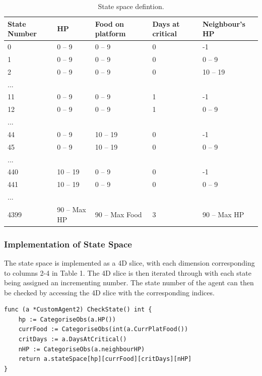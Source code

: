 \begin{table}
\centering
\caption{State space defintion.}
\begin{adjustbox}{width=\columnwidth,center}
\begin{tabular}{@{}lllll@{}}
\toprule
State Number & HP          & Food on platform & Days at critical & Neighbour’s HP \\ \midrule
0            & 0 – 9       & 0 – 9            & 0                & -1             \\
1            & 0 – 9       & 0 – 9            & 0                & 0 – 9          \\
2            & 0 – 9       & 0 – 9            & 0                & 10 – 19        \\
...          &             &                  &                  &                \\
11           & 0 – 9       & 0 – 9            & 1                & -1             \\
12           & 0 – 9       & 0 – 9            & 1                & 0 – 9          \\
...          &             &                  &                  &                \\
44           & 0 – 9       & 10 – 19          & 0                & -1             \\
45           & 0 – 9       & 10 – 19          & 0                & 0 – 9          \\
...          &             &                  &                  &                \\
440          & 10 – 19     & 0 – 9            & 0                & -1             \\
441          & 10 – 19     & 0 – 9            & 0                & 0 – 9          \\
...          &             &                  &                  &                \\
4399         & 90 – Max HP & 90 – Max Food    & 3                & 90 – Max HP    \\ \bottomrule
\end{tabular}
\end{adjustbox}
\label{state-table}
\end{table}
\subsubsection{Implementation of State Space}
The state space is implemented as a 4D slice, with each dimension corresponding to columns 2-4 in Table 1. The 4D slice is then iterated through with each state being assigned an incrementing number. The state number of the agent can then be checked by accessing the 4D slice with the corresponding indices.
\begin{lstlisting}
func (a *CustomAgent2) CheckState() int {
	hp := CategoriseObs(a.HP())
	currFood := CategoriseObs(int(a.CurrPlatFood())
	critDays := a.DaysAtCritical()
	nHP := CategoriseObs(a.neighbourHP)
	return a.stateSpace[hp][currFood][critDays][nHP]
}
\end{lstlisting}
